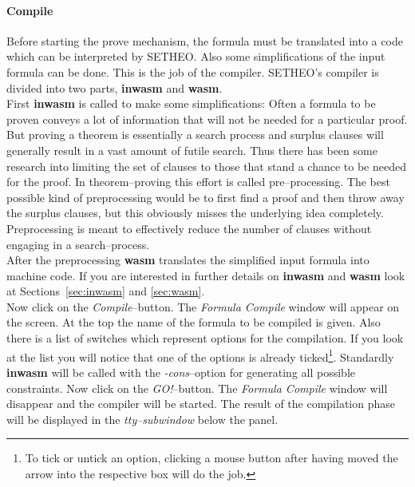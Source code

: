\paragraph{Compile}
Before starting the prove mechanism, the formula must be translated
into a code which can be interpreted by SETHEO. Also some
simplifications of the input formula can be done. This is the job of
the compiler. SETHEO's compiler is divided into two parts, {\bf
inwasm} and {\bf wasm\/}.\\ 
First {\bf inwasm\/} is called to make some simplifications: Often a
formula to  be proven conveys a lot of information that will not be
needed for a particular proof. But proving a theorem is essentially a
search process and surplus clauses will generally result in a vast
amount of futile search. Thus there has been some research into
limiting the set of clauses to those that stand a chance to be needed
for the proof. In theorem--proving this effort is called
pre--processing. The best possible kind
of preprocessing would be to first find a proof and then throw away
the surplus clauses, but this obviously misses the underlying idea
completely. Preprocessing is meant to effectively reduce the number of
clauses without engaging in a search--process.\\
After the preprocessing {\bf wasm\/} translates the simplified
input formula into machine code. If you are interested in further
details on {\bf inwasm\/} and {\bf wasm\/} look at
Sections~\ref{sec:inwasm} and \ref{sec:wasm}.\\
Now click on the {\it Compile\/}--button. The {\it Formula Compile\/}
window will appear on the screen. At the top the name of the formula
to be compiled is given. Also there is a list of switches which
represent options for the compilation. If you look at the list you
will notice that one of the options is already ticked\footnote{To
tick or untick an option, clicking a mouse button after having moved
the arrow into the respective box will do the job.}. Standardly {\bf
inwasm} will be called with the {\it -cons\/}--option for generating
all possible constraints. Now click on the {\it GO!\/}--button. The {\it
Formula Compile} window will disappear and the compiler will be
started. The result of the compilation phase will be displayed in the
{\it tty--subwindow\/} below the panel. 

